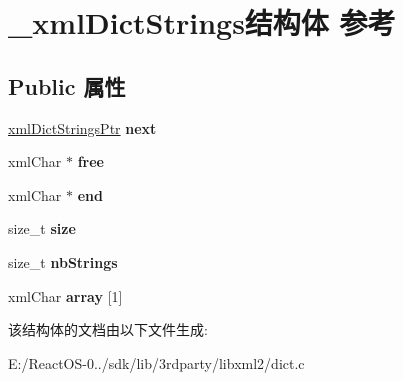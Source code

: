 \hypertarget{struct__xml_dict_strings}{}\section{\+\_\+xml\+Dict\+Strings结构体 参考}
\label{struct__xml_dict_strings}
\subsection*{Public 属性}
\begin{DoxyCompactItemize}
\item 
\mbox{\label{struct__xml_dict_strings_a8d15f8ac7e6aa88620d69dce7a7ab4e3}} 
\hyperlink{struct__xml_dict_strings}{xml\+Dict\+Strings\+Ptr} {\bfseries next}
\item 
\mbox{\label{struct__xml_dict_strings_a991acd3dc1c28e78c591f3d9bd0a86e7}} 
xml\+Char $\ast$ {\bfseries free}
\item 
\mbox{\label{struct__xml_dict_strings_a15b93389226e143fb54d5956fe7c591b}} 
xml\+Char $\ast$ {\bfseries end}
\item 
\mbox{\label{struct__xml_dict_strings_a69e21c7da01fb0ab92eb48d5ed8307b9}} 
size\+\_\+t {\bfseries size}
\item 
\mbox{\label{struct__xml_dict_strings_ac0b35fc7f1b33724eb69dd6da3afa83d}} 
size\+\_\+t {\bfseries nb\+Strings}
\item 
\mbox{\label{struct__xml_dict_strings_a639b7f2b5463316e9a13f34265b1cc2b}} 
xml\+Char {\bfseries array} \mbox{[}1\mbox{]}
\end{DoxyCompactItemize}


该结构体的文档由以下文件生成\+:\begin{DoxyCompactItemize}
\item 
E\+:/\+React\+O\+S-\/0../sdk/lib/3rdparty/libxml2/dict.\+c\end{DoxyCompactItemize}
